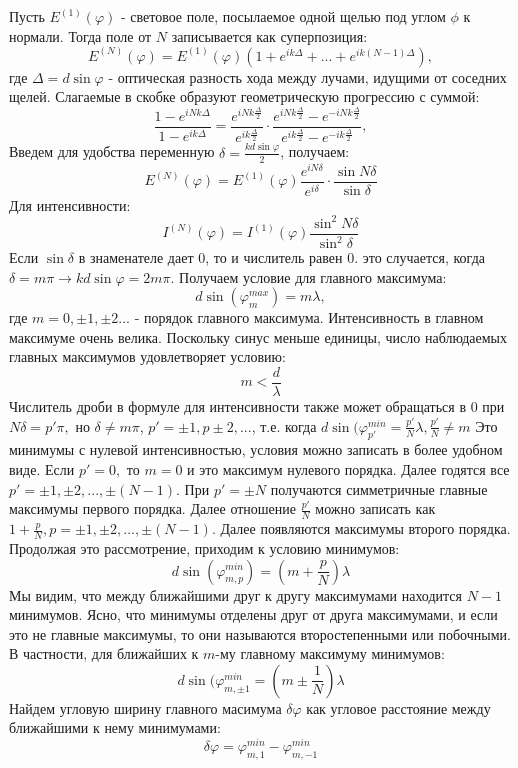 Пусть $E^{(1)} (\varphi)$ - световое поле, посылаемое одной щелью под углом $\phi$ к нормали. Тогда поле от $N$ записывается как суперпозиция:
$$E^{(N)}(\varphi) = E^{(1)}(\varphi)(1 + e^{ik\Delta} + ... + e^{ik(N-1)\Delta}),$$
где $\Delta = d\sin \varphi$ - оптическая разность хода между лучами, идущими от соседних щелей. Слагаемые в скобке образуют геометрическую прогрессию с суммой:
$$\frac{1-e^{iNk\Delta}}{1-e^{ik\Delta}} = \frac{e^{iNk\frac{\Delta}{2}}}{e^{ik\frac{\Delta}{2}}}\cdot \frac{e^{iNk\frac{\Delta}{2}} - e^{-iNk\frac{\Delta}{2}}}{e^{ik\frac{\Delta}{2}} - e^{-ik\frac{\Delta}{2}}},$$
Введем для удобства переменную $\delta = \frac{kd\sin\varphi}{2}$, получаем:
$$E^{(N)}(\varphi) = E^{(1)}(\varphi)\frac{e^{iN\delta}}{e^{i\delta}}\cdot \frac{\sin N\delta}{\sin\delta}$$
Для интенсивности:
$$I^{(N)}(\varphi) = I^{(1)}(\varphi)\frac{\sin^2 N\delta}{\sin^2\delta}$$
Если $\sin \delta$ в знаменателе дает 0, то и числитель равен 0. это случается, когда $\delta = m\pi \rightarrow kd\sin\varphi = 2m\pi$. Получаем условие для главного максимума:
$$d\sin(\varphi^{max}_m) = m\lambda,$$
где $m = 0, \pm 1, \pm 2...$ - порядок главного максимума. Интенсивность в главном максимуме очень велика. Поскольку синус меньше единицы, число наблюдаемых главных максимумов удовлетворяет условию:
$$m < \frac{d}{\lambda}$$
Числитель дроби в формуле для интенсивности также может обращаться в 0 при $N\delta = p'\pi, $ но $\delta \neq m\pi$, $p' = \pm 1, p\pm 2, ...$, т.е. когда $d\sin(\varphi ^{min}_{p'} = \frac{p'}{N}\lambda, \frac{p'}{N} \neq m$  
Это минимумы с нулевой интенсивностью, условия можно записать в более удобном виде. Если $p' = 0, $ то $m = 0$ и это максимум нулевого порядка. Далее годятся все $p' = \pm1, \pm2, ... , \pm(N-1). $ При $p' = \pm N$ получаются симметричные главные максимумы первого порядка. Далее отношение $\frac{p'}{N}$ можно записать как $1 + \frac{p}{N}, p =  \pm1, \pm2, ... , \pm(N-1)$. Далее появляются максимумы второго порядка. Продолжая это рассмотрение, приходим к условию минимумов:
$$d \sin(\varphi^{min}_{m, p}) = (m + \frac{p}{N})\lambda$$
Мы видим, что между ближайшими друг к другу максимумами находится $N - 1$ минимумов. Ясно, что минимумы отделены друг от друга максимумами, и если это не главные максимумы, то они называются второстепенными или побочными. В частности, для ближайших к $m$-му главному максимуму минимумов:
$$d\sin(\varphi^{min}_{m, \pm1} = (m \pm \frac{1}{N})\lambda$$
Найдем угловую ширину главного масимума $\delta\varphi$ как угловое расстояние между ближайшими к нему минимумами:
$$\delta\varphi = \varphi^{min}_{m, 1} - \varphi^{min}_{m, -1} $$
